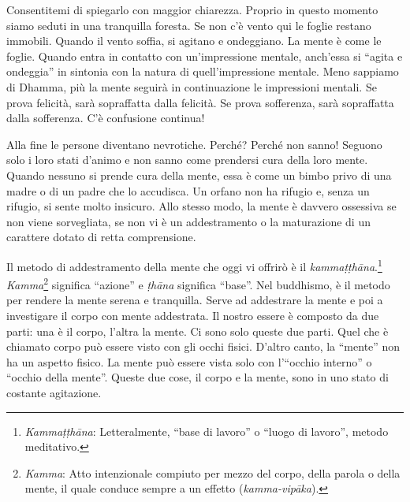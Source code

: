 Consentitemi di spiegarlo con maggior chiarezza. Proprio in questo
momento siamo seduti in una tranquilla foresta. Se non c'è vento qui le
foglie restano immobili. Quando il vento soffia, si agitano e
ondeggiano. La mente è come le foglie. Quando entra in contatto con
un'impressione mentale, anch'essa si ``agita e ondeggia'' in sintonia
con la natura di quell'impressione mentale. Meno sappiamo di Dhamma, più
la mente seguirà in continuazione le impressioni mentali. Se prova
felicità, sarà sopraffatta dalla felicità. Se prova sofferenza, sarà
sopraffatta dalla sofferenza. C'è confusione continua!

Alla fine le persone diventano nevrotiche. Perché? Perché non sanno!
Seguono solo i loro stati d'animo e non sanno come prendersi cura della
loro mente. Quando nessuno si prende cura della mente, essa è come un
bimbo privo di una madre o di un padre che lo accudisca. Un orfano non
ha rifugio e, senza un rifugio, si sente molto insicuro. Allo stesso
modo, la mente è davvero ossessiva se non viene sorvegliata, se non vi è
un addestramento o la maturazione di un carattere dotato di retta
comprensione.

Il metodo di addestramento della mente che oggi vi offrirò è il
\emph{kammaṭṭhāna}.\footnote{\emph{Kammaṭṭhāna}: Letteralmente, ``base
  di lavoro'' o ``luogo di lavoro'', metodo meditativo.}
\emph{Kamma}\footnote{\emph{Kamma}: Atto intenzionale compiuto per mezzo
  del corpo, della parola o della mente, il quale conduce sempre a un
  effetto (\emph{kamma-vipāka}).} significa ``azione'' e \emph{ṭhāna}
significa ``base''. Nel buddhismo, è il metodo per rendere la mente
serena e tranquilla. Serve ad addestrare la mente e poi a investigare il
corpo con mente addestrata. Il nostro essere è composto da due parti:
una è il corpo, l'altra la mente. Ci sono solo queste due parti. Quel
che è chiamato corpo può essere visto con gli occhi fisici. D'altro
canto, la ``mente'' non ha un aspetto fisico. La mente può essere vista
solo con l'``occhio interno'' o ``occhio della mente''. Queste due cose,
il corpo e la mente, sono in uno stato di costante agitazione.

